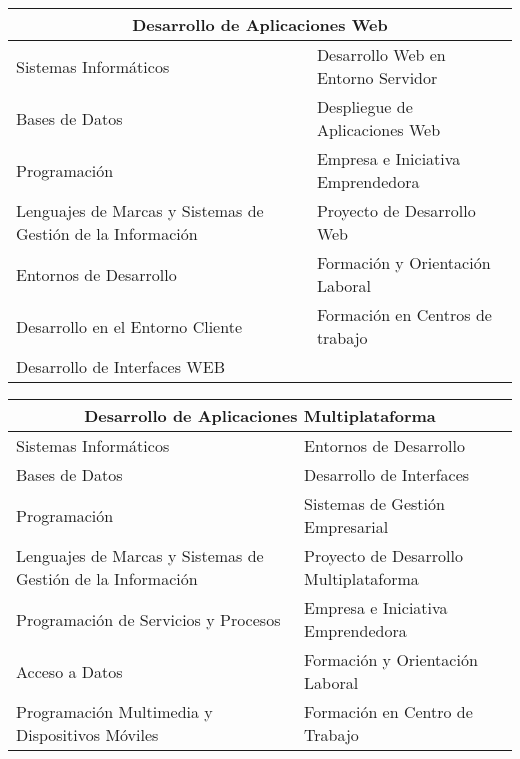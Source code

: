\begin{center}
 \begin{table}[ht]
    {\renewcommand{\arraystretch}{1.5}
        \begin{tabular}[c]{ |l|l| }
            \hline
            \multicolumn{2}{|c|}{\textbf{Desarrollo de Aplicaciones Web}} \\ \hline
            Sistemas Informáticos & Desarrollo Web en Entorno Servidor \\ \hline
            Bases de Datos & Despliegue de Aplicaciones Web \\ \hline
            Programación & Empresa e Iniciativa Emprendedora \\ \hline
            Lenguajes de Marcas y Sistemas de Gestión de la Información & Proyecto de Desarrollo Web\\ \hline
            Entornos de Desarrollo & Formación y Orientación Laboral \\ \hline
            Desarrollo en el Entorno Cliente & Formación en Centros de trabajo \\ \hline
            Desarrollo de Interfaces WEB &  \\ \hline
    \end{tabular}}
 \end{table}

 \begin{table}[ht]
    {\renewcommand{\arraystretch}{1.5}
        \begin{tabular}[c]{ |l|l| }
            \hline
            \multicolumn{2}{|c|}{\textbf{Desarrollo de Aplicaciones Multiplataforma}} \\ \hline
            Sistemas Informáticos &  Entornos de Desarrollo\\ \hline
            Bases de Datos & Desarrollo de Interfaces \\ \hline
            Programación & Sistemas de Gestión Empresarial \\ \hline
            Lenguajes de Marcas y Sistemas de Gestión de la Información & Proyecto de Desarrollo Multiplataforma \\ \hline
            Programación de Servicios y Procesos & Empresa e Iniciativa Emprendedora \\ \hline
            Acceso a Datos & Formación y Orientación Laboral \\ \hline
            Programación Multimedia y Dispositivos Móviles & Formación en Centro de Trabajo \\ \hline
    \end{tabular}}
 \end{table}



\end{center}
